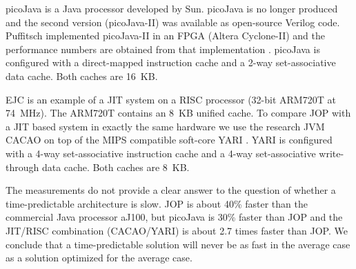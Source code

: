 
picoJava \cite{pJ1} is a Java processor developed by Sun. picoJava is
no longer produced and the second version (picoJava-II) was available
as open-source Verilog code. Puffitsch implemented picoJava-II in an
FPGA (Altera Cyclone-II) and the performance numbers are obtained
from that implementation \cite{master:puffitsch}. picoJava is
configured with a direct-mapped instruction cache and a 2-way
set-associative data cache. Both caches are 16~KB.

EJC \cite{EJC} is an example of a JIT system on a RISC processor
(32-bit ARM720T at 74~MHz). The ARM720T contains an 8~KB unified
cache. To compare JOP with a JIT based system in exactly the same
hardware we use the research JVM CACAO \cite{cacao} on top of the
MIPS compatible soft-core YARI \cite{cacao:yari}. YARI is configured
with a 4-way set-associative instruction cache and a 4-way
set-associative write-through data cache. Both caches are 8~KB.

The measurements do not provide a clear answer to the question of
whether a time-predictable architecture is slow. JOP is about 40\%
faster than the commercial Java processor aJ100, but picoJava is 30\%
faster than JOP and the JIT/RISC combination (CACAO/YARI) is about
2.7 times faster than JOP. We conclude that a time-predictable
solution will never be as fast in the average case as a solution
optimized for the average case.



